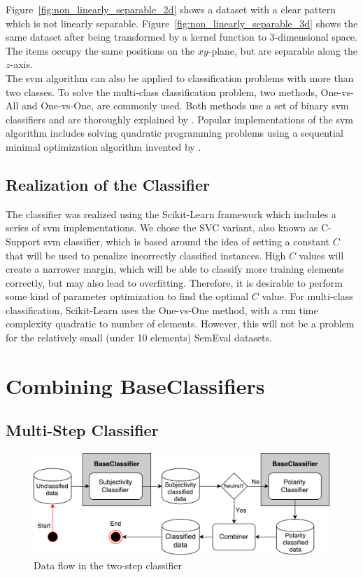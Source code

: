 Figure~\ref{fig:non_linearly_separable_2d} shows a dataset with a clear pattern which is not linearly separable. Figure~\ref{fig:non_linearly_separable_3d} shows the same dataset after being transformed by a kernel function to 3-dimensional space. The items occupy the same positions on the $xy$-plane, but are separable along the $z$-axis. \\

The \ac{svm} algorithm can also be applied to classification problems with more than two classes. To solve the multi-class classification problem, two methods, One-vs-All and One-vs-One, are commonly used. Both methods use a set of binary \ac{svm} classifiers and are thoroughly explained by \cite{HsuLin02}. Popular implementations of the \ac{svm} algorithm includes solving quadratic programming problems using a sequential minimal optimization algorithm invented by \cite{Platt98}.


\subsection*{Realization of the Classifier}
The classifier was realized using the Scikit-Learn framework which includes a series of \ac{svm} implementations. We chose the SVC variant, also known as C-Support \ac{svm} classifier, which is based around the idea of setting a constant $C$ that will be used to penalize incorrectly classified instances. High $C$ values will create a narrower margin, which will be able to classify more training elements correctly, but may also lead to overfitting. Therefore, it is desirable to perform some kind of parameter optimization to find the optimal $C$ value. For multi-class classification, Scikit-Learn uses the One-vs-One method, with a run time complexity quadratic to number of elements. However, this will not be a problem for the relatively small (under 10 elements) SemEval datasets. 


\section{Combining BaseClassifiers}
\subsection{Multi-Step Classifier}
\label{sec:multi_step_classifier}

\begin{figure}[t]
    \begin{center}
        \includegraphics[width=\textwidth]{./figs/data_flow}
    \end{center}
    \caption{Data flow in the two-step classifier}
    \label{fig:data_flow}
\end{figure}

